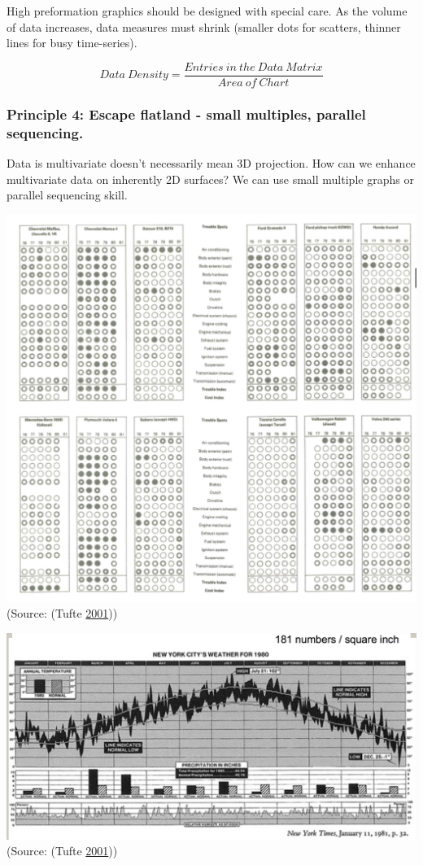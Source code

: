 \documentclass[]{book}
\begin{document}
High preformation graphics should be designed with special care. As the
volume of data increases, data measures must shrink (smaller dots for
scatters, thinner lines for busy time-series).

\[{Data \ Density} = \frac{{Entries \ in \ the \ Data \ Matrix}}{{Area \ of \ Chart}}\]

\subsubsection{Principle 4: Escape flatland - small multiples, parallel
sequencing.}\label{principle-4-escape-flatland---small-multiples-parallel-sequencing.}

Data is multivariate doesn't necessarily mean 3D projection. How can we
enhance multivariate data on inherently 2D surfaces? We can use small
multiple graphs or parallel sequencing skill.

\includegraphics{images/Tufte_figure8.png} (Source: (Tufte
\protect\hyperlink{ref-Tufte_2001}{2001}))

\includegraphics{images/Tufte_figure7.png} (Source: (Tufte
\protect\hyperlink{ref-Tufte_2001}{2001}))
\end{document}
